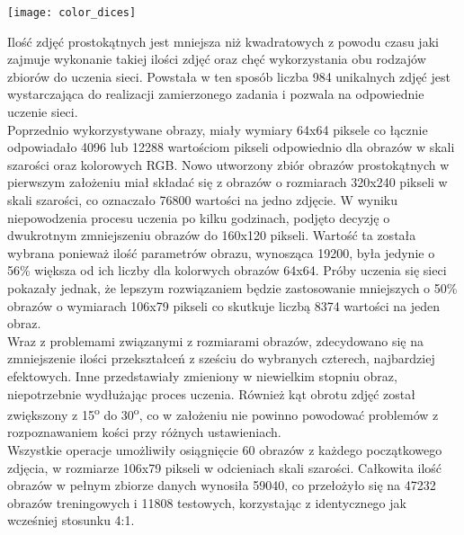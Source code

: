 \texttt{[image: color\_dices]}

Ilość zdjęć prostokątnych jest mniejsza niż kwadratowych z powodu czasu jaki zajmuje
wykonanie takiej ilości zdjęć oraz chęć wykorzystania obu rodzajów zbiorów do uczenia sieci.
Powstała w ten sposób liczba 984 unikalnych zdjęć jest wystarczająca do realizacji
zamierzonego zadania i pozwala na odpowiednie uczenie sieci. \\
Poprzednio wykorzystywane obrazy, miały wymiary 64x64 piksele co łącznie odpowiadało
4096 lub 12288 wartościom pikseli odpowiednio dla obrazów w skali szarości oraz
kolorowych RGB. Nowo utworzony zbiór obrazów prostokątnych w pierwszym założeniu miał
składać się z obrazów o rozmiarach 320x240 pikseli w skali szarości, co oznaczało
76800 wartości na jedno zdjęcie. W wyniku niepowodzenia procesu uczenia po kilku godzinach,
podjęto decyzję o dwukrotnym zmniejszeniu obrazów do 160x120 pikseli. Wartość ta
została wybrana ponieważ ilość parametrów obrazu, wynosząca 19200, była jedynie o 56\%
większa od ich liczby dla kolorwych obrazów 64x64. Próby uczenia się sieci pokazały jednak,
że lepszym rozwiązaniem będzie zastosowanie mniejszych o 50\% obrazów o wymiarach
106x79 pikseli co skutkuje liczbą 8374 wartości na jeden obraz.\\
Wraz z problemami związanymi z rozmiarami obrazów, zdecydowano się na zmniejszenie ilości
przekształceń z sześciu do wybranych czterech, najbardziej efektowych. Inne przedstawiały
zmieniony w niewielkim stopniu obraz, niepotrzebnie wydłużając proces
uczenia. Również kąt obrotu zdjęć został zwiększony z 15\textsuperscript{o}
do 30\textsuperscript{o}, co w założeniu nie powinno powodować problemów z rozpoznawaniem
kości przy różnych ustawieniach. \\
Wszystkie operacje umożliwiły osiągnięcie 60 obrazów z każdego początkowego zdjęcia, w rozmiarze
106x79 pikseli w odcieniach skali szarości. Całkowita ilość obrazów w pełnym zbiorze
danych wynosiła 59040, co przełożyło się na 47232 obrazów treningowych i 11808 testowych,
korzystając z identycznego jak wcześniej stosunku 4:1.
